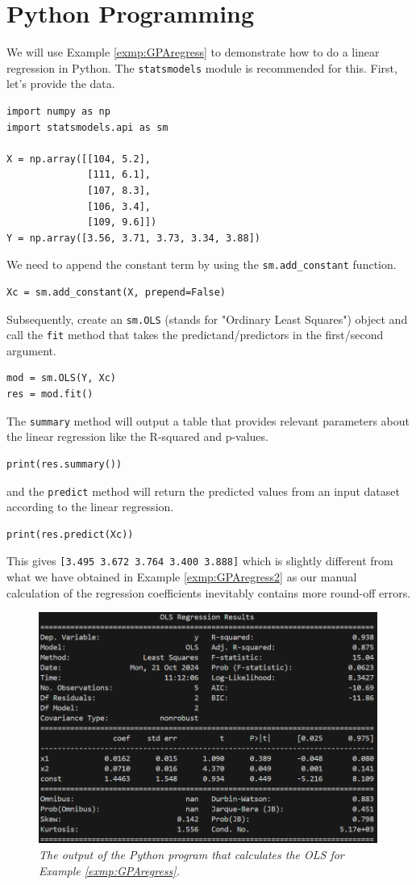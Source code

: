 \section{Python Programming}

We will use Example \ref{exmp:GPAregress} to demonstrate how to do a linear regression in Python. The \verb|statsmodels| module is recommended for this. First, let's provide the data.
\begin{lstlisting}
import numpy as np
import statsmodels.api as sm

X = np.array([[104, 5.2],
              [111, 6.1],
              [107, 8.3],
              [106, 3.4],
              [109, 9.6]]) 
Y = np.array([3.56, 3.71, 3.73, 3.34, 3.88])
\end{lstlisting}
We need to append the constant term by using the \verb|sm.add_constant| function.
\begin{lstlisting}
Xc = sm.add_constant(X, prepend=False)
\end{lstlisting}
Subsequently, create an \verb|sm.OLS| (stands for "Ordinary Least Squares") object and call the \verb|fit| method that takes the predictand/predictors in the first/second argument.
\begin{lstlisting}
mod = sm.OLS(Y, Xc)
res = mod.fit()
\end{lstlisting}
The \verb|summary| method will output a table that provides relevant parameters about the linear regression like the R-squared and p-values.
\begin{lstlisting}
print(res.summary())
\end{lstlisting}
and the \verb|predict| method will return the predicted values from an input dataset according to the linear regression.
\begin{lstlisting}
print(res.predict(Xc))    
\end{lstlisting}
This gives \verb|[3.495 3.672 3.764 3.400 3.888]| which is slightly different from what we have obtained in Example \ref{exmp:GPAregress2} as our manual calculation of the regression coefficients inevitably contains more round-off errors.
\begin{figure}[ht!]
    \centering
    \includegraphics[width=0.99\textwidth]{graphics/OLS_table.png}
    \caption{\textit{The output of the Python program that calculates the OLS for Example \ref{exmp:GPAregress}.}}
\end{figure}

